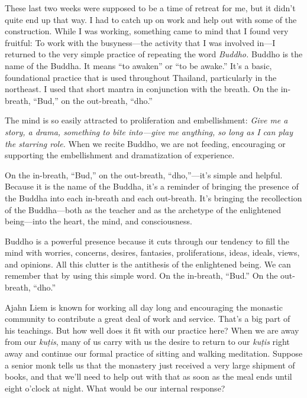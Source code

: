 
These last two weeks were supposed to be a time of retreat for me, but 
it didn't quite end up that way. I had to catch up on work and help out 
with some of the construction. While I was working, something came to 
mind that I found very fruitful: To work with the busyness---the 
activity that I was involved in---I returned to the very simple 
practice of repeating the word \emph{Buddho.} Buddho is the name of the 
Buddha. It means ``to awaken'' or ``to be awake.'' It's a basic, 
foundational practice that is used throughout Thailand, particularly in 
the northeast. I used that short mantra in conjunction with the breath. 
On the in-breath, ``Bud,'' on the out-breath, ``dho.''

The mind is so easily attracted to proliferation and embellishment: 
\emph{Give me a story, a drama, something to bite into---give me 
anything, so long as I can play the starring role.} When we recite 
Buddho, we are not feeding, encouraging or supporting the embellishment 
and dramatization of experience.

On the in-breath, ``Bud,'' on the out-breath, ``dho,''---it's simple 
and helpful. Because it is the name of the Buddha, it's a reminder of 
bringing the presence of the Buddha into each in-breath and each 
out-breath. It's bringing the recollection of the Buddha---both as the 
teacher and as the archetype of the enlightened being---into the heart, 
the mind, and consciousness.

Buddho is a powerful presence because it cuts through our tendency to 
fill the mind with worries, concerns, desires, fantasies, 
proliferations, ideas, ideals, views, and opinions. All this clutter is 
the antithesis of the enlightened being. We can remember that by using 
this simple word. On the in-breath, ``Bud.'' On the out-breath, ``dho.''


Ajahn Liem is known for working all day long and encouraging the 
monastic community to contribute a great deal of work and service. 
That's a big part of his teachings. But how well does it fit with our 
practice here? When we are away from our \emph{kuṭis}, many of us 
carry with us the desire to return to our \emph{kuṭis} right away and 
continue our formal practice of sitting and walking meditation. Suppose 
a senior monk tells us that the monastery just received a very large 
shipment of books, and that we'll need to help out with that as soon as 
the meal ends until eight o'clock at night. What would be our internal 
response?

